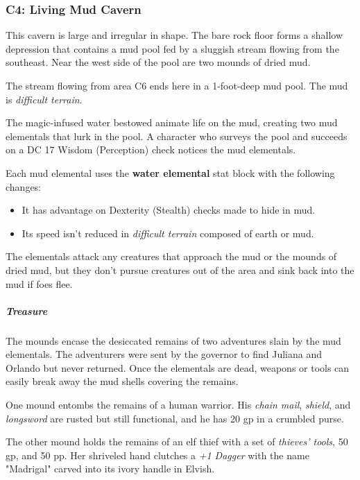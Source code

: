 \documentclass[10pt,a4paper,twoside,bg=print,twocolumn,openany,nodeprecatedcode]{dndbook}
\begin{document}
\subsubsection{C4: Living Mud Cavern}
\begin{DndReadAloud}{}
This cavern is large and irregular in shape. The bare rock floor forms a shallow depression that contains a mud pool fed by a sluggish stream flowing from the southeast. Near the west side of the pool are two mounds of dried mud.

\end{DndReadAloud}

The stream flowing from area C6 ends here in a 1-foot-deep mud pool. The mud is \textit{difficult terrain}.

The magic-infused water bestowed animate life on the mud, creating two mud elementals that lurk in the pool. A character who surveys the pool and succeeds on a DC 17 Wisdom (Perception) check notices the mud elementals.

Each mud elemental uses the \textbf{water elemental} stat block with the following changes:


\begin{itemize}
\item It has advantage on Dexterity (Stealth) checks made to hide in mud.
\item Its speed isn't reduced in \textit{difficult terrain} composed of earth or mud.
\end{itemize}

The elementals attack any creatures that approach the mud or the mounds of dried mud, but they don't pursue creatures out of the area and sink back into the mud if foes flee.

\subparagraph{Treasure}
The mounds encase the desiccated remains of two adventures slain by the mud elementals. The adventurers were sent by the governor to find Juliana and Orlando but never returned. Once the elementals are dead, weapons or tools can easily break away the mud shells covering the remains.

One mound entombs the remains of a human warrior. His \textit{chain mail}, \textit{shield}, and \textit{longsword} are rusted but still functional, and he has 20 gp in a crumbled purse.

The other mound holds the remains of an elf thief with a set of \textit{thieves' tools}, 50 gp, and 50 pp. Her shriveled hand clutches a \textit{+1 Dagger} with the name "Madrigal" carved into its ivory handle in Elvish.
\end{document}
